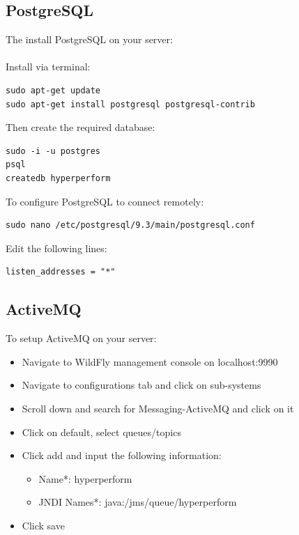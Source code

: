 \documentclass[11pt,a4paper]{article}
\begin{document}
\subsection{PostgreSQL}
The install PostgreSQL on your server: \\\\
Install via terminal:
\begin{lstlisting}
sudo apt-get update
sudo apt-get install postgresql postgresql-contrib
\end{lstlisting}
Then create the required database:
\begin{lstlisting}
sudo -i -u postgres
psql
createdb hyperperform
\end{lstlisting}
To configure PostgreSQL to connect remotely:
\begin{lstlisting}
sudo nano /etc/postgresql/9.3/main/postgresql.conf
\end{lstlisting}
Edit the following lines:
\begin{lstlisting}
listen_addresses = "*"
\end{lstlisting}



\subsection{ActiveMQ}
To setup ActiveMQ on your server: \\
\begin{itemize}
	\item Navigate to WildFly management console on localhost:9990
	\item Navigate to configurations tab and click on sub-systems
	\item Scroll down and search for Messaging-ActiveMQ and click on it
	\item Click on default, select queues/topics
	\item Click add and input the following information:
		\begin{itemize}
			\item Name*: hyperperform
			\item JNDI Names*: java:/jms/queue/hyperperform
		\end{itemize}
	\item Click save \\
\end{itemize}
\end{document}
